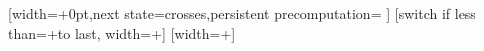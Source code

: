 
{%
  [width=+0pt,next state=crosses,persistent precomputation={
    \edef\pgf@lib@dec@ssw{\pgfmathresult pt}
    \edef\pgf@lib@dec@ssh{\pgfmathresult pt}
  }]{}%
  [switch if less than=+\pgfdecorationsegmentlength to last,
                  width=+\pgfdecorationsegmentlength]
  {
    \pgfpathmoveto{\pgfqpoint{-\pgf@lib@dec@ssw}{\pgf@lib@dec@ssh}}
    \pgfpathlineto{\pgfqpoint{\pgf@lib@dec@ssw}{-\pgf@lib@dec@ssh}}
    \pgfpathmoveto{\pgfqpoint{-\pgf@lib@dec@ssw}{-\pgf@lib@dec@ssh}}
    \pgfpathlineto{\pgfqpoint{\pgf@lib@dec@ssw}{\pgf@lib@dec@ssh}}
  }%
  [width=+\pgfdecoratedremainingdistance]
  {
    \pgfpathmoveto{\pgfqpoint{-\pgf@lib@dec@ssw}{\pgf@lib@dec@ssh}}
    \pgfpathlineto{\pgfqpoint{\pgf@lib@dec@ssw}{-\pgf@lib@dec@ssh}}
    \pgfpathmoveto{\pgfqpoint{-\pgf@lib@dec@ssw}{-\pgf@lib@dec@ssh}}
    \pgfpathlineto{\pgfqpoint{\pgf@lib@dec@ssw}{\pgf@lib@dec@ssh}}
  }%
}%






%
%
%

\newif\ifpgf@lib@shapedecoration@betweenborders

\edef\pgf@lib@shapedecoration@initialise{0pt}%

